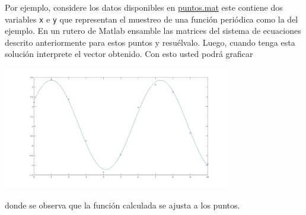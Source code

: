 \documentclass[letterpaper,11pt]{article}
\newcommand{\matlab}{{\sc Matlab} }
\begin{document}
Por ejemplo, considere los datos disponibles en 
\href{ftp://ftp.ing-mat.udec.cl/pub/ing-mat/asignaturas/521230/ejercicios/2018-1/puntos.mat}{puntos.mat}
este contiene dos variables \texttt{x} e \texttt{y} que representan el muestreo de una funci\'on peri\'odica como la del ejemplo. En un rutero de \matlab ensamble las matrices del sistema de ecuaciones descrito anteriormente para estos puntos y resu\'elvalo. Luego, cuando tenga esta soluci\'on interprete el vector obtenido. Con esto usted podr\'a graficar 
\begin{center}
\includegraphics[width=0.75\textwidth]{./periodica.jpg}\\
\vspace{-5mm}
\end{center}
donde se observa que la funci\'on calculada se ajusta a los puntos.
\end{document}
